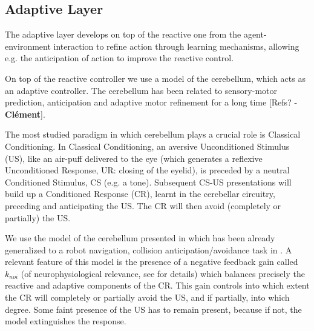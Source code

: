\documentclass[letterpaper, 10 pt, conference]{ieeeconf}  %
\newcommand\cmf[1]{{\footnotesize \color{red}[#1 - \textbf{Cl\'ement}]}} %
\begin{document}

\subsection{Adaptive Layer}

The adaptive layer develops on top of the reactive one from the agent-environment interaction to refine action through learning mechanisms, allowing e.g. the anticipation of action to improve the reactive control. 


On top of the reactive controller we use a model of the cerebellum, which acts as an adaptive controller. The cerebellum has been related to sensory-motor prediction, anticipation and adaptive motor refinement for a long time \cmf{Refs?}.

The most studied paradigm in which cerebellum plays a crucial role is Classical Conditioning. In Classical Conditioning, an aversive Unconditioned Stimulus (US), like an air-puff delivered to the eye (which generates a reflexive Unconditioned Response, UR: closing of the eyelid), is preceded by a neutral Conditioned Stimulus, CS (e.g. a tone). Subsequent CS-US presentations will build up a Conditioned Response (CR), learnt in the cerebellar circuitry, preceding and anticipating the US. The CR will then avoid (completely or partially) the US.

We use the model of the cerebellum presented in \cite{herreros2013nucleo} which has been already generalized to a robot navigation, collision anticipation/avoidance task in \cite{herreros2013speed}. A relevant feature of this model is the presence of a negative feedback gain called $k_{noi}$ (of neurophysiological relevance, see \cite{herreros2013nucleo} for details) which balances precisely the reactive and adaptive components of the CR. This gain controls into which extent the CR will completely or partially avoid the US, and if partially, into which degree. Some faint presence of the US has to remain present, because if not, the model extinguishes the response.
\end{document}
